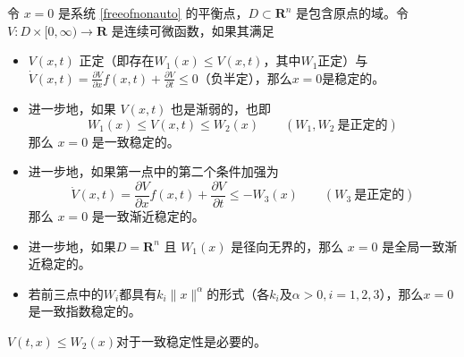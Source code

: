 \begin{theorem}[非自治系统的Lyapunov稳定性定理]\label{lyapunov_nonauto}
  令 $x = 0$ 是系统 \eqref{freeofnonauto} 的平衡点，$D \subset
  \mathbf{R}^n$ 是包含原点的域。令 $V: D \times [0, \infty) \rightarrow \mathbf{R}$
  是连续可微函数，如果其满足
  \begin{itemize}[leftmargin=1em]
    \item $V (x, t)$ 正定（即存在$W_1 (x) \leq V (x, t)$，其中$W_1$正定）与
    $\dot{V} (x, t) = \frac{\partial V}{\partial x} f (x, t) + \frac{\partial V}{\partial t} \leq 0$（负半定），那么$x=0$是稳定的。
    
    \item 进一步地，如果 $V (x, t)$ 也是渐弱的，也即
    \[ W_1 (x) \leq V (x, t) \leq W_2 (x) \qquad (W_1, W_2 \ \text{是正定的}) \]
    那么 $x = 0$ 是一致稳定的。
    
    \item 进一步地，如果第一点中的第二个条件加强为
    \[ \dot{V} (x, t) = \frac{\partial V}{\partial x} f (x, t) + \frac{\partial
       V}{\partial t} \leq - W_3 (x) \qquad (W_3 \ \text{是正定的}) \]
    那么 $x = 0$ 是一致渐近稳定的。
    
    \item 进一步地，如果$D=\mathbf{R}^n$ 且 $W_1 (x)$ 是径向无界的，那么 $x = 0$ 是全局一致渐近稳定的。

    \item 若前三点中的$W_i$都具有$k_i \| x \|^\alpha $的形式（各$k_i$及$\alpha> 0,i=1,2,3$），那么$x = 0$ 是一致指数稳定的。
  \end{itemize}
\end{theorem}
\begin{note}
  $V(t,x)\le W_2(x)$对于一致稳定性是必要的。
\end{note}
